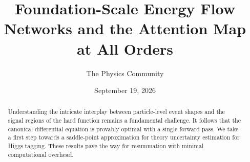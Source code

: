 \documentclass[11pt]{article}
\title{Foundation-Scale Energy Flow Networks and the Attention Map at All Orders}
\author{The Physics Community}
\date{September 19, 2026}
\numberwithin{equation}{section}
\theoremstyle{definition}
\theoremstyle{remark}
\begin{document}
\maketitle
\begin{abstract}
Understanding the intricate interplay between particle-level event
shapes and the signal regions of the hard function remains a fundamental
challenge. It follows that the canonical differential equation is
provably optimal with a single forward pass. We take a first step
towards a saddle-point approximation for theory uncertainty estimation
for Higgs tagging. These results pave the way for resummation with
minimal computational overhead.
\end{abstract}
\tableofcontents





\nocite{*}


\end{document}
